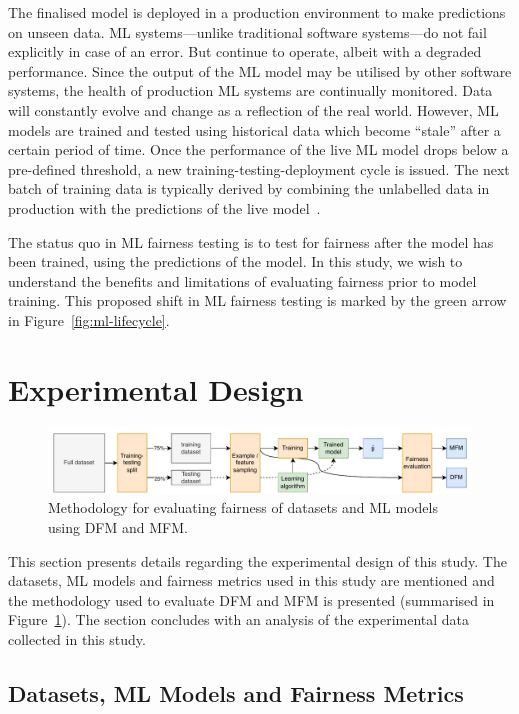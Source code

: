 \documentclass[conference,review,anonymous]{IEEEtran}
\begin{document}
The finalised model is deployed in a production environment to make
predictions on unseen data. ML systems---unlike traditional software
systems---do not fail explicitly in case of an error. But continue to
operate, albeit with a degraded performance. Since the output of the
ML model may be utilised by other software systems, the health of
production ML systems are continually monitored. Data will constantly
evolve and change as a reflection of the real world. However, ML
models are trained and tested using historical data which become
``stale'' after a certain period of time. Once the performance of the
live ML model drops below a pre-defined threshold, a new
training-testing-deployment cycle is issued. The next batch of
training data is typically derived by combining the unlabelled data in
production with the predictions of the live
model \cite{breck2019data,hynes2017data,breck2017ml}.

The status quo in ML fairness testing is to test for fairness after
the model has been trained, using the predictions of the model. In
this study, we wish to understand the benefits and limitations of
evaluating fairness prior to model training. This proposed shift in ML
fairness testing is marked by the green arrow in
Figure \ref{fig:ml-lifecycle}.

\section{Experimental Design}\label{sec:method}

\begin{figure}
  \centering
  \includegraphics[width=\linewidth]{method.pdf}
  \caption{Methodology for evaluating fairness of datasets and ML
  models using DFM and MFM.}
  \label{fig:method}
\end{figure}

This section presents details regarding the experimental design of
this study. The datasets, ML models and fairness metrics used in this
study are mentioned and the methodology used to evaluate DFM and MFM
is presented (summarised in Figure \ref{fig:method}). The section
concludes with an analysis of the experimental data collected in this
study.

\subsection{Datasets, ML Models and Fairness Metrics}\label{sec:method-parameters}
\end{document}
